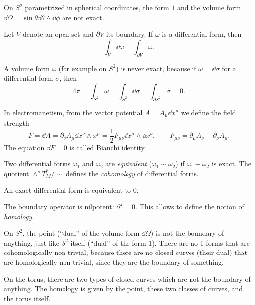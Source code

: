 \documentclass[a4paper,12pt]{book}
\begin{document}
\begin{example}
On $S^2$ parametrized in spherical coordinates, the form $1$ and the volume form $\dd\Omega=\sin\theta\dd\theta\wedge\dd\phi$ are not exact.
\end{example}

\begin{theorem}[Stokes]
Let $V$ denote an open set and $\partial V$ its boundary. If $\omega$ is a differential form, then
\[\int_V\dd\omega=\int_{\partial V}\omega.\]
\end{theorem}

\begin{corollary}
A volume form $\omega$ (for example on $S^2$) is never exact, because if $\omega=\dd\sigma$ for a differential form $\sigma$, then
\[4\pi=\int_{S^2}\omega=\int_{S^2}\dd\sigma=\int_{\partial S^2}\sigma=0.\]
\end{corollary}

In electromanetism, from the vector potential $A=A_\mu\dd x^\mu$ we define the field strength
\[F=\dd A=\partial_\nu A_\mu\dd x^\nu\wedge x^\mu=\frac{1}{2}F_{\mu\nu}\dd x^\mu\wedge\dd x^\nu,\qquad F_{\mu\nu}=\partial_\mu A_\nu-\partial_\nu A_\mu.\]
The equation $\dd F=0$ is called Bianchi identity.

\begin{definition}
Two differential forms $\omega_1$ and $\omega_2$ are \emph{equivalent} ($\omega_1\sim\omega_2$) if $\omega_1-\omega_2$ is exact. The quotient $\wedge^s T_M^*/\sim$ defines the \emph{cohomology} of differential forms.
\end{definition}

\begin{example}
An exact differential form is equivalent to 0.
\end{example}

The boundary operator is nilpotent: $\partial^2=0$. This allows to define the notion of \emph{homology}.

\begin{example}
On $S^2$, the point (``dual'' of the volume form $\dd\Omega$) is not the boundary of anything, just like $S^2$ itself (``dual'' of the form 1). There are no 1-forms that are cohomologically non trivial, because there are no closed curves (their dual) that are homologically non trivial, since they are the boundary of something.
\end{example}

\begin{example}
On the torus, there are two types of closed curves which are not the boundary of anything. The homology is given by the point, these two classes of curves, and the torus itself.
\end{example}
\end{document}
